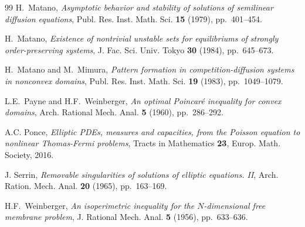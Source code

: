 \documentclass[a4paper,12pt,fullpage]{article}
\numberwithin{equation}{section}
\begin{document}
\begin{thebibliography}{99}
 H.~Matano, {\sl Asymptotic behavior and stability of solutions of semilinear diffusion equations}, Publ. Res. Inst. Math. Sci. {\bf 15} (1979), pp.~401--454.

 H.~Matano, {\sl Existence of nontrivial unstable sets for equilibriums of strongly order-preserving systems}, J. Fac. Sci. Univ. Tokyo {\bf 30} (1984), pp.~645--673.

 H.~Matano and M.~Mimura, {\sl Pattern formation in competition-diffusion systems in nonconvex domains}, Publ. Res. Inst. Math. Sci. {\bf 19} (1983), pp.~1049--1079.

 L.E.~Payne and H.F.~Weinberger, {\sl An optimal Poincar\'e inequality for convex domains}, Arch. Rational Mech. Anal. {\bf 5} (1960), pp.~286--292.

 A.C. Ponce, {\sl Elliptic PDEs, measures and capacities, from the Poisson equation to nonlinear Thomas-Fermi problems}, Tracts in Mathematics {\bf 23}, Europ. Math. Society, 2016.

 J. Serrin, {\sl Removable singularities of solutions of elliptic equations. II}, Arch. Ration. Mech. Anal. {\bf 20} (1965), pp.~163--169.

 H.F.~Weinberger, {\sl An isoperimetric inequality for the $N$-dimensional free membrane problem}, J. Rational Mech. Anal. {\bf 5} (1956), pp.~633--636.

\end{thebibliography}
\end{document}
